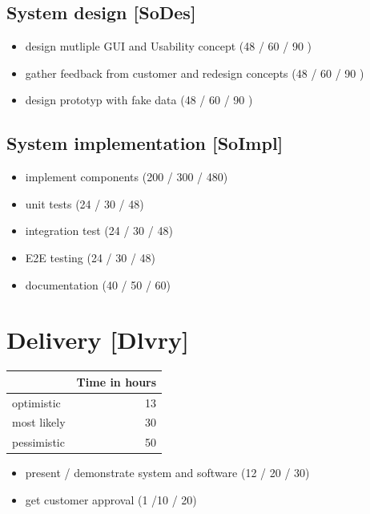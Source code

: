 \documentclass
[
 12pt, %
       DIV12,
       a4paper, %
       oneside, %
       titlepage, %
       parskip=half, %
       headings=normal, %
       listof=totoc, %
       bibliography=totoc, %
       index=totoc, %
       captions=tableheading, %
       ]{scrreprt}
\begin{document}
\section{System design [SoDes]}
\label{sec:org1137d7c}
\begin{itemize}
\item design mutliple GUI and Usability concept (48 / 60 / 90 )
\item gather feedback from customer and redesign concepts (48 / 60 / 90 )
\item design prototyp with fake data (48 / 60 / 90 )
\end{itemize}
\section{System implementation [SoImpl]}
\label{sec:orgf2f809f}
\begin{itemize}
\item implement components (200 / 300 / 480)
\item unit tests (24 / 30 / 48)
\item integration test (24 / 30 / 48)
\item E2E testing (24 / 30 / 48)
\item documentation (40 / 50 / 60)
\end{itemize}



\chapter{Delivery [Dlvry]}
\label{sec:org1388080}
\begin{center}
\begin{tabular}{|l|r|}
	\hline
	& Time in hours\\
	\hline
	optimistic & 13\\
	\hline
	most likely & 30\\
	\hline
	pessimistic & 50\\
	\hline
\end{tabular}
\end{center}
\begin{itemize}
\item present / demonstrate system and software (12 / 20 / 30)
\item get customer approval (1 /10 / 20)
\end{itemize}
\end{document}
